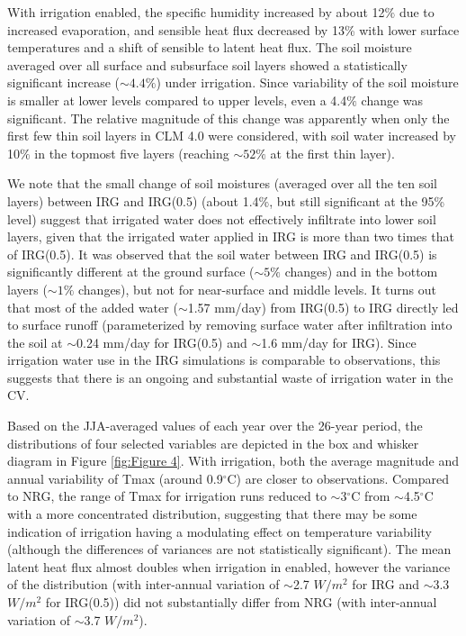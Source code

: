 \documentclass[draft,ms]{agutex}   %
\begin{document}
\begin{article}
With irrigation enabled, the specific humidity increased by about 12$\%$ due to increased evaporation, and sensible heat flux decreased by 13\% with lower surface temperatures and a shift of sensible to latent heat flux. The soil moisture averaged over all surface and subsurface soil layers showed a statistically significant increase ($\sim4.4\%$) under irrigation. Since variability of the soil moisture is smaller at lower levels compared to upper levels, even a 4.4$\%$ change was significant.  The relative magnitude of this change was apparently when only the first few thin soil layers in CLM 4.0 were considered, with soil water increased by 10$\%$ in the topmost five layers (reaching $\sim52\%$ at the first thin layer).


We note that the small change of soil moistures (averaged over all the ten soil layers) between IRG and IRG(0.5) (about 1.4$\%$, but still significant at the 95\% level) suggest that irrigated water does not effectively infiltrate into lower soil layers, given that the irrigated water applied in IRG is more than two times that of IRG(0.5). It was observed that the soil water between IRG and IRG(0.5) is significantly different at the ground surface ($\sim5\%$ changes) and in the bottom layers ($\sim1\%$ changes), but not for near-surface and middle levels. It turns out that most of the added water ($\sim$1.57 mm/day) from IRG(0.5) to IRG directly led to surface runoff (parameterized by removing surface water after infiltration into the soil at $\sim$0.24 mm/day for IRG(0.5) and $\sim$1.6 mm/day for IRG). Since irrigation water use in the IRG simulations is comparable to observations, this suggests that there is an ongoing and substantial waste of irrigation water in the CV.


Based on the JJA-averaged values of each year over the 26-year period, the distributions of four selected variables are depicted in the box and whisker diagram in Figure \ref{fig:Figure 4}. With irrigation, both the average magnitude and annual variability of Tmax (around 0.9$^\circ$C) are closer to observations. Compared to NRG, the range of Tmax for irrigation runs reduced to $\sim$3$^\circ$C from $\sim$4.5$^\circ$C with a more concentrated distribution, suggesting that there may be some indication of irrigation having a modulating effect on temperature variability (although the differences of variances are not statistically significant). The mean latent heat flux almost doubles when irrigation in enabled, however the variance of the distribution (with inter-annual variation of $\sim$2.7 $W/m^2$ for IRG and $\sim$3.3 $W/m^2$ for IRG(0.5)) did not substantially differ from NRG (with inter-annual variation of $\sim$3.7 $W/m^2$). 


\end{article}
\end{document}
